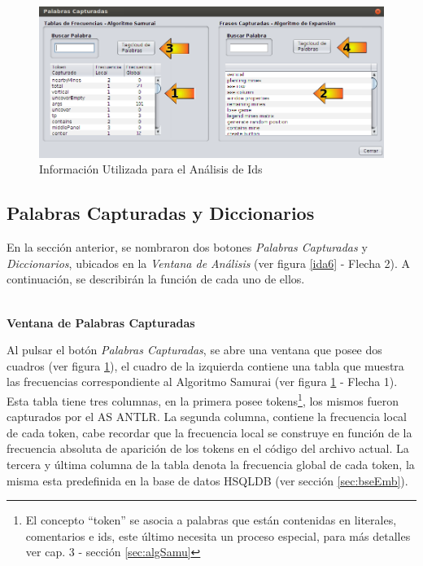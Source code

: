 \begin{figure}[t] %
\centerline{%
\includegraphics[scale= 0.55]{./cap4/ida_07.png}
}
\caption{Información Utilizada para el Análisis de Ids}
\label{ida7}
\end{figure}

\subsection{Palabras Capturadas y Diccionarios}
\label{sec:panPalDicc}

En la sección anterior, se nombraron dos botones \textit{Palabras Capturadas} y \textit{Diccionarios}, ubicados en la \textit{Ventana de Análisis} (ver figura \ref{ida6} - Flecha 2). A continuación, se describirán la función de cada uno de ellos.

\noindent \textbf{\\Ventana de Palabras Capturadas\\} 

Al pulsar el botón \textit{Palabras Capturadas}, se abre una ventana que posee dos cuadros (ver figura \ref{ida7}), el cuadro de la izquierda contiene una tabla que muestra las frecuencias correspondiente al Algoritmo Samurai (ver figura \ref{ida7} - Flecha 1). Esta tabla tiene tres columnas, en la primera posee tokens\footnote[1]{El concepto “token” se asocia a palabras que están contenidas en literales, comentarios e ids, este último necesita un proceso especial, para más detalles ver cap. 3 - sección \ref{sec:algSamu}}, los mismos fueron capturados por el AS ANTLR. La segunda columna, contiene la frecuencia local de cada token, cabe recordar que la frecuencia local se construye en función de la frecuencia absoluta de aparición de los tokens en el código del archivo actual. La tercera y última columna de la tabla denota la frecuencia global de cada token, la misma esta predefinida en la base de datos HSQLDB (ver sección \ref{sec:bseEmb}).

